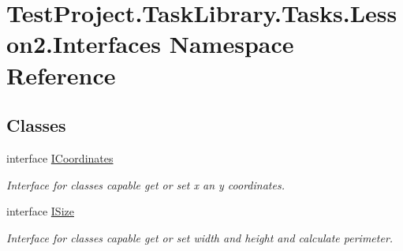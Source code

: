 \hypertarget{namespace_test_project_1_1_task_library_1_1_tasks_1_1_lesson2_1_1_interfaces}{}\section{Test\+Project.\+Task\+Library.\+Tasks.\+Lesson2.\+Interfaces Namespace Reference}
\label{namespace_test_project_1_1_task_library_1_1_tasks_1_1_lesson2_1_1_interfaces}
\subsection*{Classes}
\begin{DoxyCompactItemize}
\item 
interface \mbox{\hyperlink{interface_test_project_1_1_task_library_1_1_tasks_1_1_lesson2_1_1_interfaces_1_1_i_coordinates}{I\+Coordinates}}
\begin{DoxyCompactList}\small\item\em Interface for classes capable get or set x an y coordinates. \end{DoxyCompactList}\item 
interface \mbox{\hyperlink{interface_test_project_1_1_task_library_1_1_tasks_1_1_lesson2_1_1_interfaces_1_1_i_size}{I\+Size}}
\begin{DoxyCompactList}\small\item\em Interface for classes capable get or set width and height and calculate perimeter. \end{DoxyCompactList}\end{DoxyCompactItemize}
